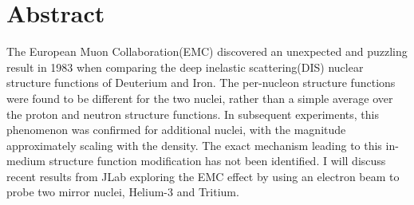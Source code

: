 \chapter*{Abstract}\label{ch:abstract}
The European Muon Collaboration(EMC) discovered an unexpected and puzzling result in 1983 when comparing the deep inelastic scattering(DIS) nuclear structure functions of Deuterium and Iron. The per-nucleon structure functions were found to be different for the two nuclei, rather than a simple average over the proton and neutron structure functions.  In subsequent experiments, this phenomenon was confirmed for additional nuclei, with the magnitude approximately scaling with the density.  The exact mechanism leading to this in-medium structure function modification has not been identified.  I will discuss recent results from JLab exploring the EMC effect by using an electron beam to probe two mirror nuclei, Helium-3 and Tritium. 
